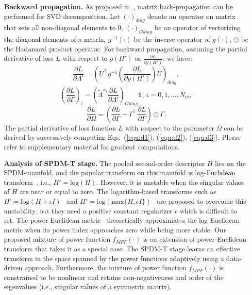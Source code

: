 \documentclass[runningheads]{llncs}
\begin{document}
\noindent
\textbf{Backward propagation.} As proposed in~\cite{Catalin2}, matrix back-propagation can be performed for SVD decomposition. Let $(\cdot)_{diag}$ denote an operator on matrix that sets all non-diagonal elements to $0$, $(\cdot)_{Gdiag}$ be an operator of vectorizing the diagonal elements of a matrix, $g^{-1}(\cdot)$ be the inverse operator of $g(\cdot)$, $\odot$ be the Hadamard product operator.
For backward propagation, assuming the partial derivative of loss $L$ with respect to $g(H')$ as $\frac{\partial L}{\partial g(H')}$,  we have:
\begin{equation}
\frac{\partial L}{\partial \Lambda'} = (U^{\top} g^{-1}(\frac{\partial L}{\partial g(H')}) U)_{diag},
\label{equ:d1}
\end{equation}
\begin{equation}
(\frac{\partial L}{\partial \Gamma})_i = (\tilde{\Lambda}^{\alpha_i}\frac{\partial L}{\partial \Lambda'})_{Gdiag}^{\top} \mathbf{1},~i=0,1,...,N_m,
\label{equ:d2}
\end{equation}
\begin{equation}
\frac{\partial L}{\partial \Omega} = (\frac{\partial L}{\partial \Gamma} -\Gamma^{\top} \frac{\partial L}{\partial \Gamma} )\odot\Gamma.
\label{equ:d3}
\end{equation}
The partial derivative of loss function $L$ with respect to the parameter $\Omega$ can be derived by successively computing Eqs.~(\ref{equ:d1}), (\ref{equ:d2}), (\ref{equ:d3}). Please refer to supplementary material for gradient computations.

\noindent
\textbf{Analysis of SPDM-T stage.} The pooled second-order descriptor $H$ lies on the SPDM-manifold, and the popular transform on this manifold is log-Euclidean transform~\cite{dryden2009non-euclidean}, i.e., $H' = \mbox{log}(H)$. However, it is unstable when the singular values of $H$ are near or equal to zero.  The logarithm-based transforms such as $H' = \mbox{log}(H+\epsilon I)$~\cite{Catalin2} and $H' = \mbox{log}(\mbox{max}\{H, \epsilon I\})$~\cite{huang2016a} are proposed to overcome this unstability, but they need a positive constant regularizer $\epsilon$  which is difficult to set. 
The power-Euclidean metric~\cite{dryden2009non-euclidean} theoretically approximates the log-Euclidean metric when its power index approaches zero while being more stable. Our proposed mixture of power function $f_{MPF}(\cdot)$ is an extension of power-Euclidean transform that takes it as a special case. The SPDM-T stage learns an effective transform in the space spanned by the power functions adaptively using a data-driven approach. Furthermore, the mixture of power function $f_{MPF}(\cdot)$ is constrained to be nonlinear and retains non-negativeness and order of the eigenvalues (i.e., singular values of a symmetric matrix).
\end{document}
